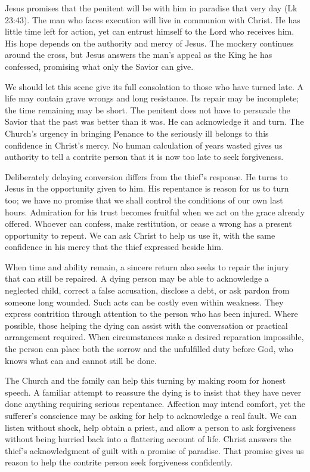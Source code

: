 Jesus promises that the penitent will be with him in paradise that very day (Lk 23:43). The man who faces execution will live in communion with Christ. He has little time left for action, yet can entrust himself to the Lord who receives him. His hope depends on the authority and mercy of Jesus. The mockery continues around the cross, but Jesus answers the man's appeal as the King he has confessed, promising what only the Savior can give.

We should let this scene give its full consolation to those who have turned late. A life may contain grave wrongs and long resistance. Its repair may be incomplete; the time remaining may be short. The penitent does not have to persuade the Savior that the past was better than it was. He can acknowledge it and turn. The Church's urgency in bringing Penance to the seriously ill belongs to this confidence in Christ's mercy. No human calculation of years wasted gives us authority to tell a contrite person that it is now too late to seek forgiveness.

Deliberately delaying conversion differs from the thief's response. He turns to Jesus in the opportunity given to him. His repentance is reason for us to turn too; we have no promise that we shall control the conditions of our own last hours. Admiration for his trust becomes fruitful when we act on the grace already offered. Whoever can confess, make restitution, or cease a wrong has a present opportunity to repent. We can ask Christ to help us use it, with the same confidence in his mercy that the thief expressed beside him.

When time and ability remain, a sincere return also seeks to repair the injury that can still be repaired. A dying person may be able to acknowledge a neglected child, correct a false accusation, disclose a debt, or ask pardon from someone long wounded. Such acts can be costly even within weakness. They express contrition through attention to the person who has been injured. Where possible, those helping the dying can assist with the conversation or practical arrangement required. When circumstances make a desired reparation impossible, the person can place both the sorrow and the unfulfilled duty before God, who knows what can and cannot still be done.

The Church and the family can help this turning by making room for honest speech. A familiar attempt to reassure the dying is to insist that they have never done anything requiring serious repentance. Affection may intend comfort, yet the sufferer's conscience may be asking for help to acknowledge a real fault. We can listen without shock, help obtain a priest, and allow a person to ask forgiveness without being hurried back into a flattering account of life. Christ answers the thief's acknowledgment of guilt with a promise of paradise. That promise gives us reason to help the contrite person seek forgiveness confidently.


